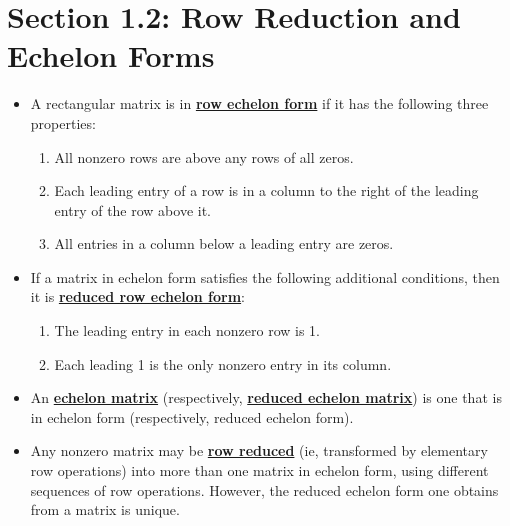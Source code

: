 \documentclass{article}
\newtheorem{theorem}{Theorem}
\newcommand{\definition}[1]{\underline{\textbf{#1}}}
\begin{document}
\section*{Section 1.2: Row Reduction and Echelon Forms}

\begin{itemize}

\item A rectangular matrix is in \definition{row echelon form} if it has the following three properties:
\begin{enumerate}
  \item All nonzero rows are above any rows of all zeros.
  \item Each leading entry of a row is in a column to the right of the leading entry of the row above it.
  \item All entries in a column below a leading entry are zeros.
\end{enumerate}

\item If a matrix in echelon form satisfies the following additional conditions, then it is \definition{reduced row echelon form}:
\begin{enumerate}
  \item The leading entry in each nonzero row is 1.
  \item Each leading 1 is the only nonzero entry in its column.
\end{enumerate}

\item An \definition{echelon matrix} (respectively, \definition{reduced echelon matrix}) is one that is in echelon form (respectively, reduced echelon form).

\item Any nonzero matrix may be \definition{row reduced} (ie, transformed by elementary row operations) into more than one matrix in echelon form, using different sequences of row operations.
However, the reduced echelon form one obtains from a matrix is unique.

\end{itemize}

\noindent{}
\end{document}
